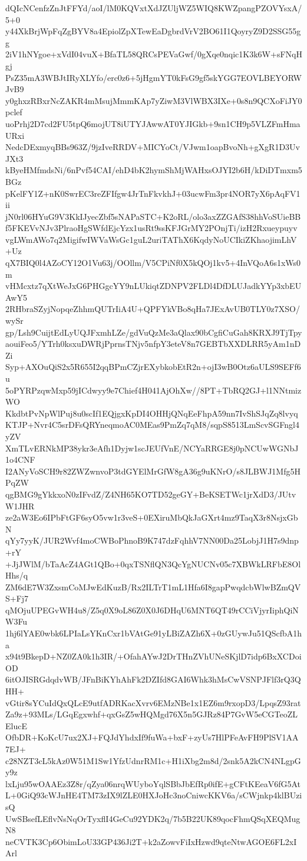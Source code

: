 dQIcNCenfzZnJtFFYd/aoI/lM0KQVxtXdJZUljWZ5WIQ8KWZpangPZOVYsxA/5+0
y44XkBrjWpFqZgBYV8a4EpiolZpXTewEaDgbrdVrV2BO61I1QoyryZ9D2SSG55gg
2iV1hNYgoe+xVdI04vuX+BfaTL58QRCsPEVaGwf/0gXqe0nqic1K3k6W+sFNqHgj
PsZ35mA3WBJtIRyXLYfo/erc0z6+5jHgmYT0kFsG9gf5skYGG7EOVLBEYORWJvB9
y0ghxzRBxrNcZAKR4mMsujMmmKAp7yZiwM3VlWBX3IXe+0s8n9QCXoFiJY0pclef
uoPrhj2D7cd2FU5tpQ6mojUT8iUTYJAwwAT0YJIGkb+9sn1CH9p5VLZFmHmaURxi
NedcDExmyqBBs963Z/9jzIveRRDV+MICYoCt/VJwm1oapBvoNh+gXgR1D3UvJXt3
kByeHMfmdsNi/6nPvf54CAI/ehD4bK2hymShMjWAHxsOJYI2b6H/kDiDTmxm5BGz
pKelFY1Z+nK0SwrEC3reZFIfgw4JrTnFkvkhJ+03ucwFm3pr4NOR7yX6pAqFV1ii
jN0rl06HYuG9V3KkIJyecZbf5sNAPaSTC+K2oRL/olo3axZZGAfS38hhVoSUieBB
f5FKEVvNJv3PlraoHgSWfdEjcYzx1usRt9ssKFJGrMY2POnjTi/izH2Rxueypuyv
vgLWmAWo7q2MigifwIWVaWsGc1guL2uriTAThX6KqdyNoUCIkiZKhaojimLhV+Uz
qX7BIQ0l4AZoCY12O1Vu63j/OOllm/V5CPiNf0X5kQOj1kv5+4InVQoA6s1xWs0m
vHMcxtz7qXtWeJxG6PHGgcYY9nLUkiqtZDNPV2FLDl4DfDLUJadkYYp3xbEUAwY5
2RHbraSZyjNopqeZhhmQUTrIiA4U+QPFYkVBo8qHa7JExAvUB0TLY0z7XSO/wySr
gp/Lsh9CuijtEdLyUQJFxmhLZe/gdVuQzMe3aQlax90bCgfiCuGah8KRXJ9TjTpy
aouiFeo5/YTrh0ksxuDWRjPprnsTNjv5nfpY3eteV8n7GEBTbXXDLRR5yAm1nDZi
Syp+AXOuQiS2x5R655I2qqBPmCZjrEXybkobEtR2n+ojI3wB0Otz6aULS9SEFf6u
5oPYRPzqwMxp59jICdwyy9e7Chief4H041AjOhXw//8PT+TbRQ2GJ+l1NNtmizWO
KkdbtPvNpWlPuj8u0scIf1EQjgxKpDI4OHHjQNqEeFhpA59nn7IvShSJqZq8lvyq
KTJP+Nvr4C5srDFsQRYneqmoAC0MEas9PmZq7qM8/sqpS8513LmScvSGFngl4yZV
XmTLvERNkMP38ykr3eAfh1Dyjw1scJEUfVnE/NCYaRRGE8j0pNCUwWGNbJ1o4CNF
I2ANyVoSCH9r82ZWZwnvoP3tdGYElMrGfW8gA36g9uKNrO/s8JLBWJ1Mfg5HPqZW
qgBMG9gYkkxoN0zIFvdZ/Z4NH65KO7TD52geGY+BeKSETWc1jrXdD3/JUtvW1JHR
ze2aW3Eo6IPbFtGF6syO5vw1r3veS+0EXiruMbQkJaGXrt4mz9TaqX3r8NsjxGbN
qYy7yyK/JUR2Wvf4moCWBoPhnoB9K747dzFqhhV7NN00Da25LobjJ1H7s9dnp+rY
+JjJWlM/bTaAcZ4AGt1QBo+0qxTSNflQN3QcYgNUCNv05c7XBWkLRFbE8OlHhs/q
ZM6dE7W3ZxsmCoMJwEdKuzB/Rx2ILTrT1mL1Hfa6I8gapPwqdcbWlwBZmQVS+Fj7
qMOjuUPEGvWH4u8/Z5q0X9oL86Z0X0J6DHqU6MNT6QT49rCCiVjyrIiphQiNW3Fu
1hj6lYAE0wbk6LPIaLsYKnCxr1bVAtGe91yLBiZAZh6X+0zGUywJu51QScfbA1ha
x94t9BkepD+NZ0ZA0k1h3IR/+OfahAYwJ2DrTHnZVhUNeSKjlD7idp6BxXCDoiOD
6itOJISRGdqdvWB/JFnBiKYhAhFk2DZIfd8GAI6Whk3hMsCwVSNPJFlf3rQ3QHH+
vGtir8sYCuIdQxQLcE9utfADRKacXvrv6EMzNBe1x1EZ6m9rxopD3/LpqsZ93rat
Za9z+93MLs/LGqEgxwhf+qxGsZ5wHQMgd76X5n5GJRz84P7GvW5eCGTeoZLElucE
OfbDR+KoKcU7ux2XJ+FQJdYhdxIf9fuWa+bxF+zyUs7HlPFeAvFH9PlSV1AA7EJ+
c28NZT3cL5kAz0W51M1Sw1YfzUdnrRM1c+H1iXbg2m8d/2snk5A2kCN4NLgpGy9z
lxLju95wOAAEz3Z8r/qZya06nrqWUyboYqlSBbJbEfRp0ifE+gCFtKEeaV6fG5At
L+0GiQ93cWJnHE4TM73zIX9lZLE0HXJoHc3noCniwcKKV6a/sCWjnkp4klBUzisQ
UwSBsefLEflvNsNqOrTyxflI4GeCu92YDK2q/7b5B22UK89qocFhmQSqXEQMugN8
neCVTK3Cp6ObimLoU33GP436Ji2T+k2aZowvFiIxHzwd9qteNtwAGOE6FL2xIArl
